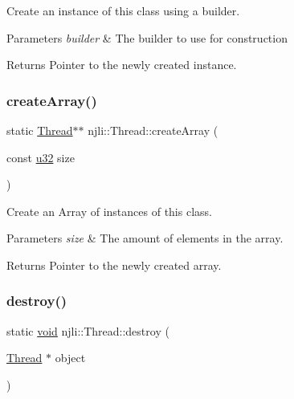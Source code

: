 Create an instance of this class using a builder.


\begin{DoxyParams}{Parameters}
{\em builder} & The builder to use for construction\\
\hline
\end{DoxyParams}
\begin{DoxyReturn}{Returns}
Pointer to the newly created instance. 
\end{DoxyReturn}
\mbox{\label{classnjli_1_1_thread_a30ca432834fe539f3560b9964f789a0f}} 
\subsubsection{\texorpdfstring{create\+Array()}{createArray()}}
{\footnotesize\ttfamily static \mbox{\hyperlink{classnjli_1_1_thread}{Thread}}$\ast$$\ast$ njli\+::\+Thread\+::create\+Array (\begin{DoxyParamCaption}\item[{const \mbox{\hyperlink{_util_8h_a10e94b422ef0c20dcdec20d31a1f5049}{u32}}}]{size }\end{DoxyParamCaption})\hspace{0.3cm}{\ttfamily [static]}}

Create an Array of instances of this class.


\begin{DoxyParams}{Parameters}
{\em size} & The amount of elements in the array.\\
\hline
\end{DoxyParams}
\begin{DoxyReturn}{Returns}
Pointer to the newly created array. 
\end{DoxyReturn}
\mbox{\label{classnjli_1_1_thread_a9fa49919c924343758d9148294ad8e6e}} 
\subsubsection{\texorpdfstring{destroy()}{destroy()}}
{\footnotesize\ttfamily static \mbox{\hyperlink{_thread_8h_af1e856da2e658414cb2456cb6f7ebc66}{void}} njli\+::\+Thread\+::destroy (\begin{DoxyParamCaption}\item[{\mbox{\hyperlink{classnjli_1_1_thread}{Thread}} $\ast$}]{object }\end{DoxyParamCaption})\hspace{0.3cm}{\ttfamily [static]}}


